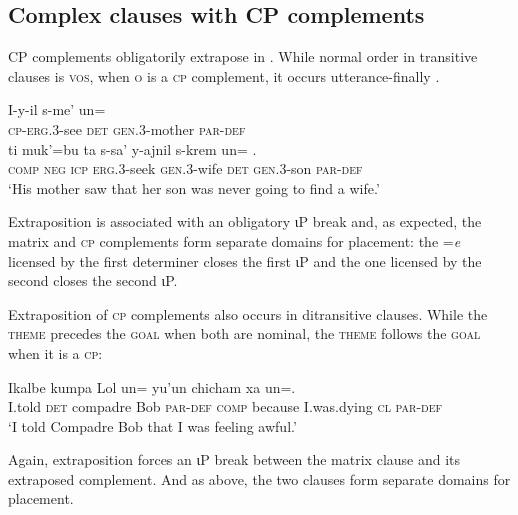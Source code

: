 \documentclass[output=paper,
modfonts
]{LSP/langsci}
\begin{document}
\subsection{Complex clauses with CP complements}
 CP complements obligatorily extrapose in . While normal order in transitive clauses is \textsc{vos},
 when \textsc{o} is a \textsc{cp} complement, it occurs utterance-finally \citep{aissen1992}.
 \begin{exe}
\ex\label{exe:zzz}\bridgeoverex
\gll I-y-il   s-me' un=  \textbardbl \\
\textsc{cp-erg.3}-see  \textsc{det} \textsc{gen.3}-mother  \textsc{par-def} {} \\
\glt {}
\gll ti muk'=bu ta s-sa' y-ajnil  s-krem un= . \\
\textsc{comp} \textsc{neg} \textsc{icp} \textsc{erg.3}-seek \textsc{gen.3}-wife  \textsc{det}  \textsc{gen.3}-son \textsc{par-def} \\ 
\glt `His mother saw that her son was never going to find a wife.'   \citep[55]{laughlin1977}
\end{exe}
Extraposition is associated with an obligatory ιP break and, as expected, the matrix and \textsc{cp} complements form separate domains for  placement: the =\emph{e} licensed by the first determiner closes the first ιP and the one licensed by the second
closes the second  ιP. 

Extraposition of \textsc{cp} complements also occurs in ditransitive clauses. While the \textsc{theme} precedes the \textsc{goal} when both are nominal,
the \textsc{theme} follows the \textsc{goal} when it is a \textsc{cp}: 
\begin{exe}
\ex\label{exe:zzz2}\bridgeoverex
\gll Ikalbe  kumpa Lol un=  \textbardbl {}  yu'un chicham xa un=. \\
I.told  \textsc{det} compadre Bob \textsc{par-def} {} \textsc{comp} because I.was.dying \textsc{cl} \textsc{par-def} \\ 
\glt `I told Compadre Bob that I was feeling awful.' \citep[30]{laughlin1980}
\end{exe}
Again, extraposition forces an ιP break between the matrix clause and its extraposed complement.
And as above, the two clauses form separate domains for  placement.
 
\end{document}
